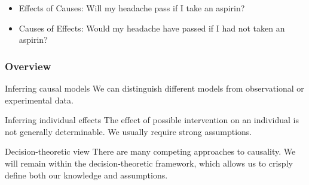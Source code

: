 \begin{frame}
\begin{example}
\begin{figure}[H]
\begin{subfigure}{\fwidth}
      \end{subfigure}
    \end{figure}
    \begin{itemize}
    \item Effects of \alert{Causes}: Will \alert{my} headache pass \alert{if I take} an aspirin?
    \item \alert{Causes} of Effects: Would \alert{my} headache have passed if I had \alert{not taken} an aspirin?
    \end{itemize}
  \end{example}
\end{frame}

\begin{frame}
  \frametitle{Overview}
  \begin{block}{Inferring causal models}
    We can distinguish different \alert{models} from observational or experimental data.
  \end{block}

  \begin{block}{Inferring individual effects}
    The effect of possible intervention on an individual is not generally determinable. We usually require strong assumptions.
  \end{block}
  
  \begin{block}{Decision-theoretic view}
    There are many competing approaches to causality. We will remain within the decision-theoretic framework, which allows us to crisply define both our knowledge and assumptions.
  \end{block}
\end{frame}

